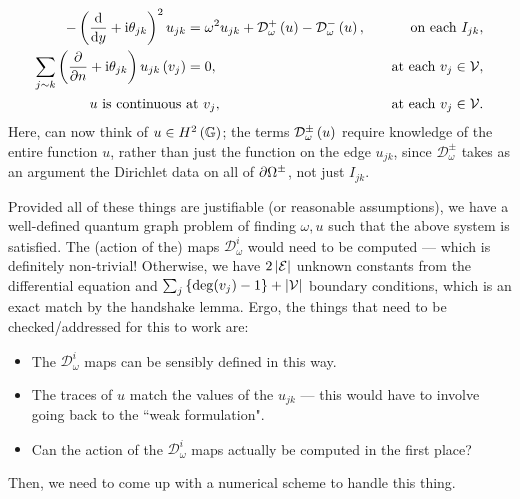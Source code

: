 \documentclass[11pt]{report}
\newcommand{\dtn}{\mathcal{D}_\omega}
\begin{document}
\begin{align*}
	-\bracs{\diff{}{y}+\rmi\qm_{jk}}^2 u_{jk} &= \omega^2 u_{jk} + \dtn^+ \bracs{u} - \dtn^- \bracs{u}, \quad &\text{on each } I_{jk}, \\
	\sum_{j\con k}\bracs{\pdiff{}{n} + \rmi\qm_{jk}}u_{jk}\bracs{v_j} &= 0, \quad &\text{at each } v_j\in\vertSet, \\
	u \text{ is continuous } & \text{at } v_j, \quad &\text{at each } v_j\in\vertSet.
\end{align*}
Here, can now think of $u\in H^2\left( \mathbb{G} \right)$; the terms $\dtn^{\pm}\bracs{u}$ require knowledge of the entire function $u$, rather than just the function on the edge $u_{jk}$, since $\dtn^{\pm}$ takes as an argument the Dirichlet data on all of $\partial\Omega^{\pm}$, not just $I_{jk}$.

Provided all of these things are justifiable (or reasonable assumptions), we have a well-defined quantum graph problem of finding $\omega, u$ such that the above system is satisfied.
The (action of the) maps $\dtn^i$ would need to be computed --- which is definitely non-trivial! 
Otherwise, we have $2\left\lvert \mathcal{E} \right\rvert$ unknown constants from the differential equation and $\sum_j\left\{  \mathrm{deg}(v_j)-1 \right\} + \left\lvert \mathcal{V} \right\rvert$ boundary conditions, which is an exact match by the handshake lemma.
Ergo, the things that need to be checked/addressed for this to work are:
\begin{itemize}
	\item The $\dtn^i$ maps can be sensibly defined in this way.
	\item The traces of $u$ match the values of the $u_{jk}$ --- this would have to involve going back to the ``weak formulation".
	\item Can the action of the $\dtn^i$ maps actually be computed in the first place?
\end{itemize}
Then, we need to come up with a numerical scheme to handle this thing.
\end{document}
